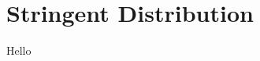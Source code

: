 
\chapter{Stringent Distribution} 
\label{appendix_stringent}
\ifpdf
    \graphicspath{{Appendix5/Figs/Raster/}{Appendix5/Figs/PDF/}{Appendix5/Figs/}}
\else
    \graphicspath{{Appendix5/Figs/Vector/}{Appendix5/Figs/}}
\fi

Hello
